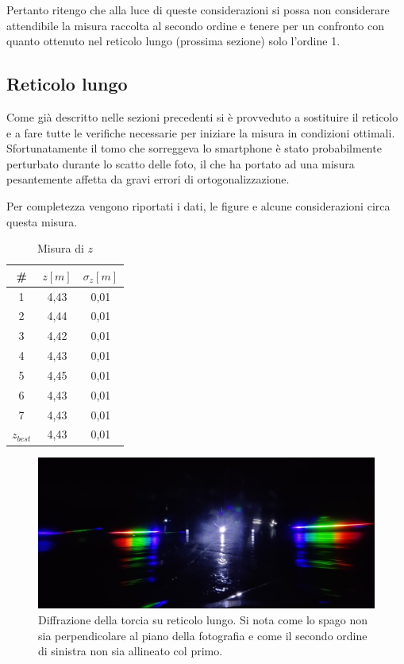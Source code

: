 \documentclass{article}
\begin{document}
\vspace{3mm}

Pertanto ritengo che alla luce di queste considerazioni si possa non considerare attendibile la misura raccolta al secondo ordine e tenere per un confronto con quanto ottenuto nel reticolo lungo (prossima sezione) solo l'ordine 1.

\pagebreak
\subsection{Reticolo lungo}

Come già descritto nelle sezioni precedenti si è provveduto a sostituire il reticolo e a fare tutte le verifiche necessarie per iniziare la misura in condizioni ottimali. Sfortunatamente il tomo che sorreggeva lo smartphone è stato probabilmente perturbato durante lo scatto delle foto, il che ha portato ad una misura pesantemente affetta da gravi errori di ortogonalizzazione. 

\vspace{3mm}

Per completezza vengono riportati i dati, le figure e alcune considerazioni circa questa misura.

\begin{table}[h]
    \centering
        \begin{tabular}{||c|c|c||}
            \hline
            \# & $z [m]$ & $\sigma_z [m]$\\
            \hline
            1 & 4,43 & 0,01 \\
            2 & 4,44 & 0,01 \\
            3 & 4,42 & 0,01 \\
            4 & 4,43 & 0,01 \\
            5 & 4,45 & 0,01 \\
            6 & 4,43 & 0,01 \\
            7 & 4,43 & 0,01 \\
            \hline
            $z_{best}$ & 4,43 & 0,01 \\
            \hline
        \end{tabular}
    \caption{Misura di $z$}
\end{table}

\begin{figure}[h]
    \centering
    \includegraphics[width=0.7\linewidth]{TorciaLungo1_OFF.jpg}
    \caption{Diffrazione della torcia su reticolo lungo. Si nota come lo spago non sia perpendicolare al piano della fotografia e come il secondo ordine di sinistra non sia allineato col primo.}
    \label{TorciaLungo}
\end{figure}
\end{document}
